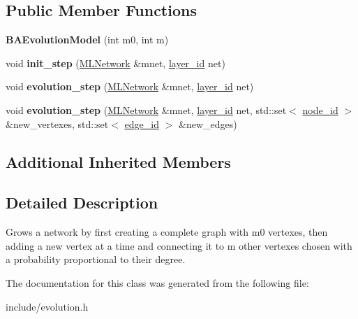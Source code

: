\subsection*{Public Member Functions}
\begin{DoxyCompactItemize}
\item 
\hypertarget{classmlnet_1_1_b_a_evolution_model_a8551399086c1ac90e583bc2859628776}{{\bfseries B\+A\+Evolution\+Model} (int m0, int m)}\label{classmlnet_1_1_b_a_evolution_model_a8551399086c1ac90e583bc2859628776}

\item 
\hypertarget{classmlnet_1_1_b_a_evolution_model_af4e5ec30340871601cb3228739ee44a4}{void {\bfseries init\+\_\+step} (\hyperlink{classmlnet_1_1_m_l_network}{M\+L\+Network} \&mnet, \hyperlink{namespacemlnet_a84ad9c6056f0eb7d129995351f9b13fb}{layer\+\_\+id} net)}\label{classmlnet_1_1_b_a_evolution_model_af4e5ec30340871601cb3228739ee44a4}

\item 
\hypertarget{classmlnet_1_1_b_a_evolution_model_a431911aa4a319849ea4d7f9ea2edc63e}{void {\bfseries evolution\+\_\+step} (\hyperlink{classmlnet_1_1_m_l_network}{M\+L\+Network} \&mnet, \hyperlink{namespacemlnet_a84ad9c6056f0eb7d129995351f9b13fb}{layer\+\_\+id} net)}\label{classmlnet_1_1_b_a_evolution_model_a431911aa4a319849ea4d7f9ea2edc63e}

\item 
\hypertarget{classmlnet_1_1_b_a_evolution_model_a59e23975027bfc11cedb3cb839e3916d}{void {\bfseries evolution\+\_\+step} (\hyperlink{classmlnet_1_1_m_l_network}{M\+L\+Network} \&mnet, \hyperlink{namespacemlnet_a84ad9c6056f0eb7d129995351f9b13fb}{layer\+\_\+id} net, std\+::set$<$ \hyperlink{namespacemlnet_a4c354f08ca868982bf3ddae882ff71c6}{node\+\_\+id} $>$ \&new\+\_\+vertexes, std\+::set$<$ \hyperlink{namespacemlnet_ad708e58e72680351e102e6b3d0489145}{edge\+\_\+id} $>$ \&new\+\_\+edges)}\label{classmlnet_1_1_b_a_evolution_model_a59e23975027bfc11cedb3cb839e3916d}

\end{DoxyCompactItemize}
\subsection*{Additional Inherited Members}


\subsection{Detailed Description}
Grows a network by first creating a complete graph with m0 vertexes, then adding a new vertex at a time and connecting it to m other vertexes chosen with a probability proportional to their degree. 

The documentation for this class was generated from the following file\+:\begin{DoxyCompactItemize}
\item 
include/evolution.\+h\end{DoxyCompactItemize}
